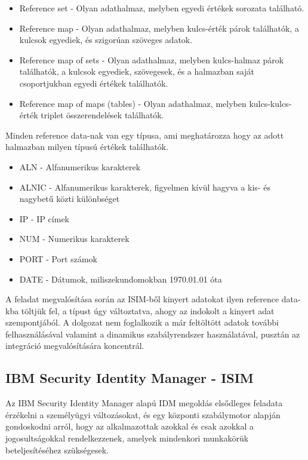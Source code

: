 \begin{itemize}
	\item Reference set - Olyan adathalmaz, melyben egyedi értékek sorozata található.
	\item Reference map - Olyan adathalmaz, melyben kulcs-érték párok találhatók, a kulcsok egyediek, és szigorúan szöveges adatok.
	\item Reference map of sets - Olyan adathalmaz, melyben kulcs-halmaz párok találhatók, a kulcsok egyediek, szövegesek, és a halmazban saját csoportjukban egyedi értékek találhatók.
	\item Reference map of maps (tables) - Olyan adathalmaz, melyben kulcs-kulcs-érték triplet összerendelések találhatók.
\end{itemize}

Minden reference data-nak van egy típusa, ami meghatározza hogy az adott halmazban milyen típusú értékek találhatók.

\begin{itemize}
	\item ALN - Alfanumerikus karakterek
	\item ALNIC - Alfanumerikus karakterek, figyelmen kívül hagyva a kis- és nagybetű közti különbséget 
	\item IP - IP címek
	\item NUM - Numerikus karakterek
	\item PORT - Port számok
	\item DATE - Dátumok, miliszekundomokban 1970.01.01 óta
\end{itemize}

A feladat megvalósítása során az ISIM-ből kinyert adatokat ilyen reference data-kba töltjük fel, a típust úgy változtatva, ahogy az indokolt a kinyert adat szempontjából. A dolgozat nem foglalkozik a már feltöltött adatok további felhasználásával valamint a dinamikus szabályrendszer használatával, pusztán az integráció megvalósítására koncentrál.

\subsection{IBM Security Identity Manager - ISIM}
\label{subsec:ISIM}
Az IBM Security Identity Manager alapú IDM megoldás elsődleges feladata érzékelni a személyügyi változásokat, és egy központi szabálymotor alapján gondoskodni arról, hogy az alkalmazottak azokkal és csak azokkal a jogosultságokkal rendelkezzenek, amelyek mindenkori munkakörük beteljesítéséhez szükségesek.

